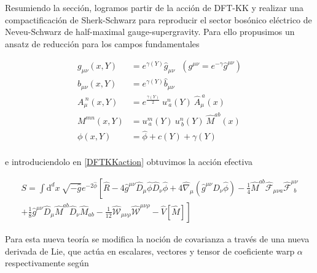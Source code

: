 \documentclass{article}
\numberwithin{equation}{section}
\begin{document}
\begin{boxumen}
	
	Resumiendo la sección, logramos partir de la acción de DFT-KK y realizar una compactificación de Sherk-Schwarz para reproducir el sector bosónico eléctrico de Neveu-Schwarz de half-maximal gauge-supergravity. Para ello propusimos un ansatz de reducción para los campos fundamentales
	
	\begin{equation}
	\begin{aligned}
	g_{\mu \nu}(x,Y)&= e^{\gamma(Y)}\hat{g}_{\mu \nu} \ \ \ (g^{\mu \nu} = e^{-\gamma}\hat{g}^{\mu \nu})\\
	b_{\mu \nu}(x,Y)&= e^{\gamma(Y)} \hat{b}_{\mu \nu}\\
	A_{\mu}^{\ n}(x,Y)&= e^{\frac{\gamma(Y)}{2}} \ u^{n}_{\ a}(Y) \ \hat{A}_{\mu}^{\ a}(x)\\
	M^{m n}(x,Y)&= u^{m}_{\ a}(Y) \ u^{n}_{\ b}(Y) \ \hat{M}^{a b}(x)\\
	\phi(x,Y)&= \hat{\phi} + c(Y) + \gamma(Y)\\
	\end{aligned}
	\end{equation}
	
	e introduciendolo en \ref{DFTKKaction} obtuvimos la acción efectiva
	
	\begin{equation}
	\begin{aligned}
	S = \int \mathrm{d}^d x \  \sqrt{-\hat{g}}e^{-2 \hat{\phi}} \left[ \hat{R} -4\hat{g}^{\mu \nu} \hat{D}_{\mu} \hat{\phi} \hat{D}_{\nu} \hat{\phi} + 4 \hat{\nabla}_{\mu} \left(\hat{g}^{\mu \nu} \hat{D}_{\nu} \hat{\phi}\right) - \frac{1}{4} \hat{M}^{a b} \hat{\mathcal{F}}_{\mu \nu a} \hat{\mathcal{F}}^{\mu \nu}_{\ \ b} \right.\\
	\left. + \frac{1}{8} \hat{g}^{\mu \nu} \hat{D}_{\mu} \hat{M}^{a b} \hat{D}_{\nu} \hat{M}_{a b}  - \frac{1}{12}\hat{\mathcal{W}}_{\mu \nu \rho}\hat{\mathcal{W}}^{\mu \nu \rho} - \hat{V}[\hat{M}] \right]
	\end{aligned}
	\end{equation}
	
	Para esta nueva teoría se modifica la noción de covarianza a través de una nueva derivada de Lie, que actúa en escalares, vectores y tensor de coeficiente warp $ \alpha $ respectivamente según
	

\end{boxumen}
\end{document}
